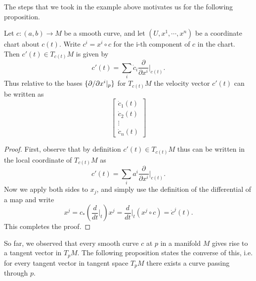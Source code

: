 The steps that we took in the example above motivates us for the following proposition.
\begin{proposition}
	Let $ c:(a,b)\to M $ be a smooth curve, and let $ (U,x^1,\cdots,x^n) $ be a coordinate chart about $ c(t) $. Write $ c^i = x^i\circ c $ for the i-th component of $ c $ in the chart. Then $ c'(t) \in T_{c(t)}M $ is given by
	\[ c'(t) = \sum_i \dot{c}_i \frac{\partial}{\partial x^i}\big|_{c(t)}. \] 
	Thus relative to the bases $ \{\partial /\partial x^i|_p\} $ for $ T_{c(t)}M $ the velocity vector $ c'(t) $ can be written as
	\[ \begin{bmatrix}
		\dot{c}_1(t) \\
		\dot{c}_2(t) \\
		\vdots \\
		\dot{c}_n(t)
	\end{bmatrix} \]
\end{proposition}
\begin{proof}
	First, observe that by definition $ c'(t) \in T_{c(t)}M  $ thus can be written in the local coordinate  of $ T_{c(t)}M $ as
	\[ c'(t) = \sum_i a^i \frac{\partial}{\partial x^i}\big|_{c(t)}. \]
	Now we apply both sides to $ x_j $, and simply use the definition of the differential of a map and write
	\[x^j = c_*(\frac{d}{dt}\big|_{t}) x^j  =  \frac{d}{dt}\big|_{t}(x^j\circ c) = \dot{c}^j(t). \]
	This completes the proof.
\end{proof}

So far, we observed that every smooth curve $ c $ at $ p $ in a manifold $ M $ gives rise to a tangent vector in $ T_pM $. The following proposition states the converse of this, i.e. for every tangent vector in tangent space $ T_pM $ there exists a curve passing through $ p $.

